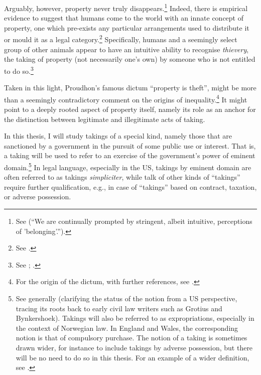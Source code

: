 Arguably, however, property never truly disappears.\footnote{See \cite[159]{gray94} (``We are continually prompted by stringent, albeit intuitive, perceptions of 'belonging'.'').} Indeed, there is empirical evidence to suggest that humans come to the world with an innate concept of property, one which pre-exists any particular arrangements used to distribute it or mould it as a legal category.\footnote{See \cite{stake06}.} Specifically, humans and a seemingly select group of other animals appear to have an intuitive ability to recognise {\it thievery}, the taking of property (not necessarily one's own) by someone who is not entitled to do so.\footnote{See \cite[11-13]{brosnan11}; \cite[159]{gray94}.}


Taken in this light, Proudhon's famous dictum ``property is theft'', might be more than a seemingly contradictory comment on the origins of inequality.\footnote{For the origin of the dictum, with further references, see \cite{wikiprod}.} It might point to a deeply rooted aspect of property itself, namely its role as an anchor for the distinction between legitimate and illegitimate acts of taking.


In this thesis, I will study takings of a special kind, namely those that are sanctioned by a government in the pursuit of some public use or interest. That is, a taking will be used to refer to an exercise of the government's power of eminent domain.\footnote{See generally \cite{stoebuck72} (clarifying the status of the notion from a US perspective, tracing its roots back to early civil law writers such as Grotius and Bynkershoek). Takings will also be referred to as expropriations, especially in the context of Norwegian law. In England and Wales, the corresponding notion is that of compulsory purchase. The notion of a taking is sometimes drawn wider, for instance to include takings by adverse possession, but there will be no need to do so in this thesis. For an example of a wider definition, see \cite[19-21]{waring09}.} In legal language, especially in the US, takings by eminent domain are often referred to as takings {\it simpliciter}, while talk of other kinds of ``takings'' require further qualification, e.g., in case of ``takings'' based on contract, taxation, or adverse possession.

